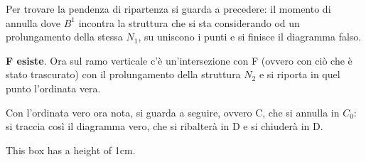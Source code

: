 \documentclass{article}
\begin{document}
\begin{adjustwidth}{2in}{}
Per trovare la pendenza di ripartenza si guarda a precedere: il momento di annulla dove $B^1$ incontra la struttura che si sta considerando od un prolungamento della stessa $N_1$, su uniscono i punti e si finisce il diagramma falso. \newline 

\textbf{F esiste}. Ora sul ramo verticale c'è un'intersezione con F (ovvero con ciò che è stato trascurato) con il prolungamento della struttura  $N_2$ e si riporta in quel punto l'ordinata vera.

Con l'ordinata vero ora nota, si guarda a seguire, ovvero C, che si annulla in $C_0$: si traccia così il diagramma vero, che si ribalterà in D e si chiuderà in D. 
	
	
		\vfill
\begin{tcolorbox}[height=4.5cm]
	This box has a height of 1cm.
\end{tcolorbox}

\end{adjustwidth}
\end{document}
